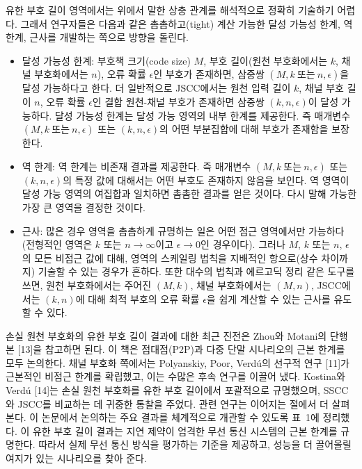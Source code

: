유한 부호 길이 영역에서는 위에서 말한 상충 관계를 해석적으로 정확히 기술하기 어렵다. 그래서 연구자들은 다음과 같은 촘촘하고(tight) 계산 가능한 달성 가능성 한계, 역 한계, 근사를 개발하는 쪽으로 방향을 돌린다.
\begin{itemize}
\item 달성 가능성 한계: 부호책 크기(code size) $M$, 부호 길이(원천 부호화에서는 $k$, 채널 부호화에서는 $n$), 오류 확률 $\epsilon$인 부호가 존재하면, 삼중쌍 $(M, k\ \text{또는}\ n, \epsilon)$을 달성 가능하다고 한다. 더 일반적으로 JSCC에서는 원천 입력 길이 $k$, 채널 부호 길이 $n$, 오류 확률 $\epsilon$인 결합 원천-채널 부호가 존재하면 삼중쌍 $(k,n,\epsilon)$이 달성 가능하다. 달성 가능성 한계는 달성 가능 영역의 내부 한계를 제공한다. 즉 매개변수 $(M, k\ \text{또는}\ n, \epsilon)$ 또는 $(k,n,\epsilon)$의 어떤 부분집합에 대해 부호가 존재함을 보장한다.
\item 역 한계: 역 한계는 비존재 결과를 제공한다. 즉 매개변수 $(M, k\ \text{또는}\ n, \epsilon)$ 또는 $(k,n,\epsilon)$의 특정 값에 대해서는 어떤 부호도 존재하지 않음을 보인다. 역 영역이 달성 가능 영역의 여집합과 일치하면 촘촘한 결과를 얻은 것이다. 다시 말해 가능한 가장 큰 영역을 결정한 것이다.
\item 근사: 많은 경우 영역을 촘촘하게 규명하는 일은 어떤 점근 영역에서만 가능하다(전형적인 영역은 $k$ 또는 $n\to\infty$이고 $\epsilon\to 0$인 경우이다). 그러나 $M$, $k$ 또는 $n$, $\epsilon$의 모든 비점근 값에 대해, 영역의 스케일링 법칙을 지배적인 항으로(상수 차이까지) 기술할 수 있는 경우가 흔하다. 또한 대수의 법칙과 에르고딕 정리 같은 도구를 쓰면, 원천 부호화에서는 주어진 $(M,k)$, 채널 부호화에서는 $(M,n)$, JSCC에서는 $(k,n)$에 대해 최적 부호의 오류 확률 $\epsilon$을 쉽게 계산할 수 있는 근사를 유도할 수 있다.
\end{itemize}

손실 원천 부호화의 유한 부호 길이 결과에 대한 최근 진전은 Zhou와 Motani의 단행본 [13]을 참고하면 된다. 이 책은 점대점(P2P)과 다중 단말 시나리오의 근본 한계를 모두 논의한다. 채널 부호화 쪽에서는 Polyanskiy, Poor, Verdú의 선구적 연구 [11]가 근본적인 비점근 한계를 확립했고, 이는 수많은 후속 연구를 이끌어 냈다. Kostina와 Verdú [14]는 손실 원천 부호화를 유한 부호 길이에서 포괄적으로 규명했으며, SSCC와 JSCC를 비교하는 데 귀중한 통찰을 주었다. 관련 연구는 이어지는 절에서 더 살펴본다. 이 논문에서 논의하는 주요 결과를 체계적으로 개관할 수 있도록 표~1에 정리했다. 이 유한 부호 길이 결과는 지연 제약이 엄격한 무선 통신 시스템의 근본 한계를 규명한다. 따라서 실제 무선 통신 방식을 평가하는 기준을 제공하고, 성능을 더 끌어올릴 여지가 있는 시나리오를 찾아 준다.

